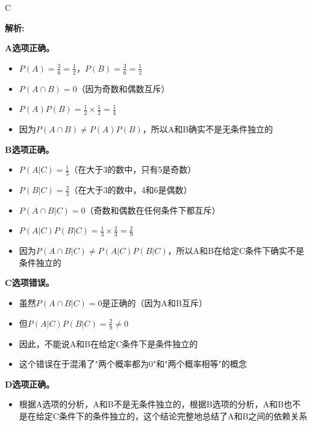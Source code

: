 \documentclass{article}
\newenvironment{explanation}
{\textbf{解析:}\par}
{\par}
\begin{document}
    \begin{correctanswer}
        C
    \end{correctanswer}
    
    \begin{explanation}
    \textbf{A选项正确。}
    \begin{itemize}
        \item \(P(A) = \frac{3}{6} = \frac{1}{2}\)，\(P(B) = \frac{3}{6} = \frac{1}{2}\)
        \item \(P(A \cap B) = 0\)（因为奇数和偶数互斥）
        \item \(P(A)P(B) = \frac{1}{2} \times \frac{1}{2} = \frac{1}{4}\)
        \item 因为\(P(A \cap B) \neq P(A)P(B)\)，所以A和B确实不是无条件独立的
    \end{itemize}
    
    \textbf{B选项正确。}
    \begin{itemize}
        \item \(P(A|C) = \frac{1}{3}\)（在大于3的数中，只有5是奇数）
        \item \(P(B|C) = \frac{2}{3}\)（在大于3的数中，4和6是偶数）
        \item \(P(A \cap B|C) = 0\)（奇数和偶数在任何条件下都互斥）
        \item \(P(A|C)P(B|C) = \frac{1}{3} \times \frac{2}{3} = \frac{2}{9}\)
        \item 因为\(P(A \cap B|C) \neq P(A|C)P(B|C)\)，所以A和B在给定C条件下确实不是条件独立的
    \end{itemize}
    
    \textbf{C选项错误。}
    \begin{itemize}
        \item 虽然\(P(A \cap B|C) = 0\)是正确的（因为A和B互斥）
        \item 但\(P(A|C)P(B|C) = \frac{2}{9} \neq 0\)
        \item 因此，不能说A和B在给定C条件下是条件独立的
        \item 这个错误在于混淆了"两个概率都为0"和"两个概率相等"的概念
    \end{itemize}
    
    \textbf{D选项正确。}
    \begin{itemize}
        \item 根据A选项的分析，A和B不是无条件独立的，根据B选项的分析，A和B也不是在给定C条件下的条件独立的，这个结论完整地总结了A和B之间的依赖关系
    \end{itemize}
    \end{explanation}
    
\end{document}
